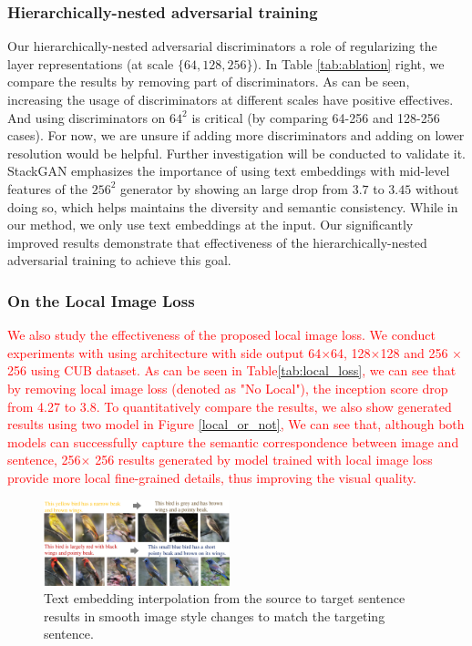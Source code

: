 \documentclass[10pt,twocolumn,letterpaper]{article}
\begin{document}
\subsubsection{Hierarchically-nested adversarial training}
Our hierarchically-nested adversarial discriminators a role of regularizing the layer representations (at scale $\{64, 128, 256\}$). 
In Table \ref{tab:ablation} right, we compare the results by removing part of discriminators. 
As can be seen, increasing the usage of discriminators at different scales have positive effectives. And using discriminators on $64^2$ is critical (by comparing 64-256 and 128-256 cases). For now, we are unsure if adding more discriminators and adding on lower resolution would be helpful. Further investigation will be conducted to validate it.
StackGAN emphasizes the importance of using text embeddings with mid-level features of the $256^2$ generator by showing an large drop from $3.7$ to $3.45$ without doing so, which helps maintains the diversity and semantic consistency. While in our method, we only use text embeddings at the input. Our significantly improved results demonstrate that effectiveness of the hierarchically-nested adversarial training to achieve this goal. 

\subsubsection{On the Local Image Loss}

\textcolor{red}{We also study the effectiveness of the proposed local image loss. We conduct experiments with using architecture with side output 64$\times$64, 128$\times$128 and 256 $\times$ 256 using CUB dataset. 
As can be seen in Table\ref{tab:local_loss}, we can see that by removing local image loss (denoted as "No Local"), the inception score drop from \textcolor{red}{4.27} to \textcolor{red}{3.8}. To quantitatively compare the results, we also show generated results using two model in Figure \ref{local_or_not}, We can see that, although both models can successfully capture the semantic correspondence between image and sentence, 256$\times$ 256 results generated by model trained with local image loss provide more local fine-grained details, thus improving the visual quality. }

\begin{figure}[t]
	\centering
	\includegraphics[width=0.48\textwidth]{figure/interp.pdf}
	\vspace{-.5cm}
	\caption{Text embedding interpolation from the source to target sentence results in smooth image style changes to match the targeting sentence. } \label{fig:interp}
	\vspace{-.3cm}
\end{figure}
\end{document}
